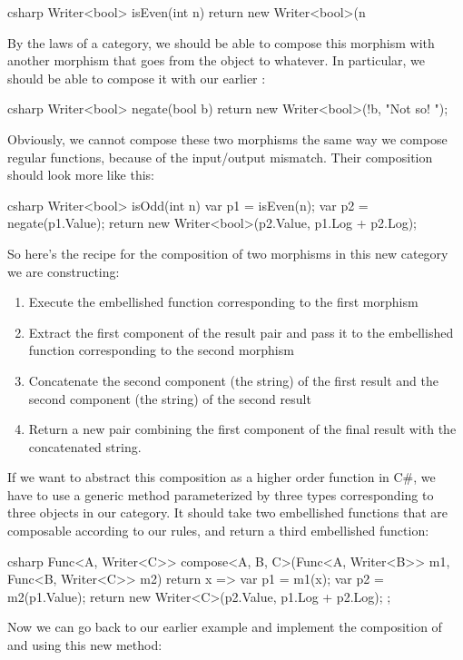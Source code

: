 \begin{snip}{csharp}
Writer<bool> isEven(int n) {
    return new Writer<bool>(n %
}
\end{snip}
By the laws of a category, we should be able to compose this morphism
with another morphism that goes from the object  to
whatever. In particular, we should be able to compose it with our
earlier :

\begin{snip}{csharp}
Writer<bool> negate(bool b) {
    return new Writer<bool>(!b, "Not so! ");
}
\end{snip}
Obviously, we cannot compose these two morphisms the same way we compose
regular functions, because of the input/output mismatch. Their
composition should look more like this:

\begin{snip}{csharp}
Writer<bool> isOdd(int n) {
    var p1 = isEven(n);
    var p2 = negate(p1.Value);
    return new Writer<bool>(p2.Value, p1.Log + p2.Log);
}
\end{snip}
So here's the recipe for the composition of two morphisms in this new
category we are constructing:

\begin{enumerate}
  \tightlist
  \item
        Execute the embellished function corresponding to the first morphism
  \item
        Extract the first component of the result pair and pass it to the
        embellished function corresponding to the second morphism
  \item
        Concatenate the second component (the string) of the first result
        and the second component (the string) of the second result
  \item
        Return a new pair combining the first component of the final result
        with the concatenated string.
\end{enumerate}

If we want to abstract this composition as a higher order function in
C\#, we have to use a generic method parameterized by three types
corresponding to three objects in our category. It should take two
embellished functions that are composable according to our rules, and
return a third embellished function:

\begin{snip}{csharp}
Func<A, Writer<C>> compose<A, B, C>(Func<A, Writer<B>> m1,
                                    Func<B, Writer<C>> m2)
{
    return x => {
        var p1 = m1(x);
        var p2 = m2(p1.Value);
        return new Writer<C>(p2.Value, p1.Log + p2.Log);
    };
}
\end{snip}
Now we can go back to our earlier example and implement the composition
of  and  using this new method:

